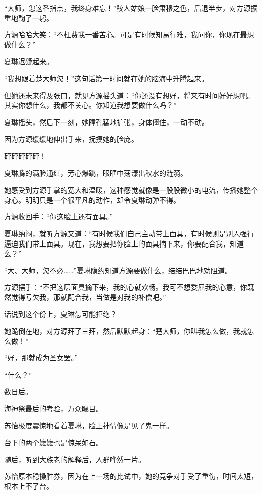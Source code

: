 
\begin{this_body}

“大师，您这番指点，我终身难忘！”鲛人姑娘一脸肃穆之色，后退半步，对方源振重地鞠了一躬。

方源哈哈大笑：“不枉费我一番苦心。可是有时候知易行难，我问你，你现在最想做什么？”

夏琳迟疑起来。

“我想跟着楚大师您！”这句话第一时间就在她的脑海中升腾起来。

但她还未来得及张口，就见方源摇头道：“你还没有想好，将来有时间好好想吧。其实你想什么，我都不关心。你知道我想要做什么吗？”

夏琳摇头，然后下一刻，她瞳孔猛地扩张，身体僵住，一动不动。

因为方源缓缓地伸出手来，抚摸她的脸庞。

砰砰砰砰砰！

夏琳腾的满脸通红，芳心爆跳，眼眶中荡漾出秋水的涟漪。

她感受到方源手掌的宽大和温暖，这种感觉就像是一股股微小的电流，传播她整个身心。明明只是一个很平凡的动作，却令夏琳动弹不得。

方源收回手：“你这脸上还有面具。”

夏琳纳闷，就听方源又道：“有时候我们自己主动带上面具，有时候则是别人强行逼迫我们带上面具。现在，我想要把你脸上的面具摘下来，你要配合我，知道么？”

“大、大师，您不必……”夏琳隐约知道方源要做什么，结结巴巴地劝阻道。

方源摆手：“不把这层面具摘下来，我的心就欢畅。我可不想委屈我的心意，你既然觉得亏欠我，那就配合我，当做是对我的补偿吧。”

话说到这个份上，夏琳怎可能拒绝？

她跪倒在地，对方源拜了三拜，然后默默起身：“楚大师，你叫我怎么做，我就怎么做！”

“好，那就成为圣女罢。”

“什么？”

数日后。

海神祭最后的考验，万众瞩目。

苏怡极度震惊地看着夏琳，脸上神情像是见了鬼一样。

台下的两个嬷嬷也是惊呆如石。

随后，听到大族老的解释后，人群哗然一片。

苏怡原本稳操胜券，因为在上一场的比试中，她的竞争对手受了重伤，时间太短，根本上不了台。


\end{this_body}
